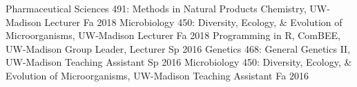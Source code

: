 

\begin{cvhonors}
  \cvhonor
    {Pharmaceutical Sciences 491: Methods in Natural Products Chemistry, UW-Madison}
    {Lecturer}
    {Fa 2018}
  \cvhonor
    {Microbiology 450: Diversity, Ecology, \& Evolution of Microorganisms, UW-Madison}
    {Lecturer}
    {Fa 2018}
  \cvhonor
    {Programming in R, ComBEE, UW-Madison}
    {Group Leader, Lecturer}
    {Sp 2016}
  \cvhonor
    {Genetics 468: General Genetics II, UW-Madison}
    {Teaching Assistant}
    {Sp 2016}
  \cvhonor
    {Microbiology 450: Diversity, Ecology, \& Evolution of Microorganisms, UW-Madison}
    {Teaching Assistant}
    {Fa 2016}
\end{cvhonors}